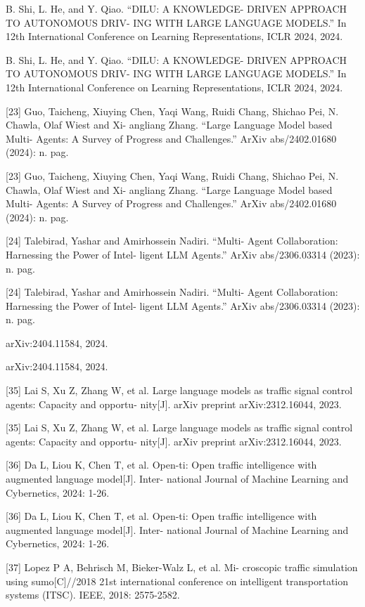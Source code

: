 \documentclass[12pt]{article}
\begin{document}
B. Shi, L. He, and Y. Qiao. “DILU: A KNOWLEDGE-
DRIVEN APPROACH TO AUTONOMOUS DRIV-
ING WITH LARGE LANGUAGE MODELS.” In 12th
International Conference on Learning Representations,
ICLR 2024, 2024.


B. Shi, L. He, and Y. Qiao. “DILU: A KNOWLEDGE-
DRIVEN APPROACH TO AUTONOMOUS DRIV-
ING WITH LARGE LANGUAGE MODELS.” In 12th
International Conference on Learning Representations,
ICLR 2024, 2024.


[23] Guo, Taicheng, Xiuying Chen, Yaqi Wang, Ruidi
Chang, Shichao Pei, N. Chawla, Olaf Wiest and Xi-
angliang Zhang. “Large Language Model based Multi-
Agents: A Survey of Progress and Challenges.” ArXiv
abs/2402.01680 (2024): n. pag.


[23] Guo, Taicheng, Xiuying Chen, Yaqi Wang, Ruidi
Chang, Shichao Pei, N. Chawla, Olaf Wiest and Xi-
angliang Zhang. “Large Language Model based Multi-
Agents: A Survey of Progress and Challenges.” ArXiv
abs/2402.01680 (2024): n. pag.


[24] Talebirad, Yashar and Amirhossein Nadiri. “Multi-
Agent Collaboration: Harnessing the Power of Intel-
ligent LLM Agents.” ArXiv abs/2306.03314 (2023): n.
pag.


[24] Talebirad, Yashar and Amirhossein Nadiri. “Multi-
Agent Collaboration: Harnessing the Power of Intel-
ligent LLM Agents.” ArXiv abs/2306.03314 (2023): n.
pag.


arXiv:2404.11584, 2024.


arXiv:2404.11584, 2024.


[35] Lai S, Xu Z, Zhang W, et al. Large language models
as traffic signal control agents: Capacity and opportu-
nity[J]. arXiv preprint arXiv:2312.16044, 2023.


[35] Lai S, Xu Z, Zhang W, et al. Large language models
as traffic signal control agents: Capacity and opportu-
nity[J]. arXiv preprint arXiv:2312.16044, 2023.


[36] Da L, Liou K, Chen T, et al. Open-ti: Open traffic
intelligence with augmented language model[J]. Inter-
national Journal of Machine Learning and Cybernetics,
2024: 1-26.


[36] Da L, Liou K, Chen T, et al. Open-ti: Open traffic
intelligence with augmented language model[J]. Inter-
national Journal of Machine Learning and Cybernetics,
2024: 1-26.


[37] Lopez P A, Behrisch M, Bieker-Walz L, et al. Mi-
croscopic traffic simulation using sumo[C]//2018 21st
international conference on intelligent transportation
systems (ITSC). IEEE, 2018: 2575-2582.
\end{document}
